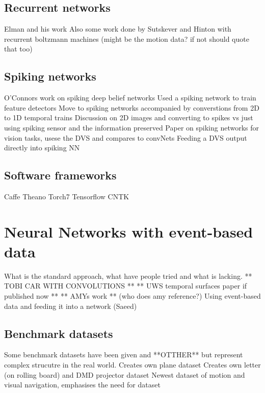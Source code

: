 \pagebreak
\subsection{Recurrent networks}  %
Elman and his work\cite{elman1990}
Also some work done by Sutskever and Hinton with recurrent boltzmann machines (might be the motion data? if not should quote that too)\cite{sutskever2009recurrent}

\pagebreak
\subsection{Spiking networks}    %
O'Connors work on spiking deep belief networks \cite{OConnor2013}
Used a spiking network to train feature detectors \cite{afshar2016investigation}
Move to spiking networks accompanied by converstions from 2D to 1D temporal trains \cite{afshar2013ripple}
Discussion on 2D images and converting to spikes vs just using spiking sensor and the information preserved \cite{akolkar2015can}
Paper on spiking networks for vision tasks, usese the DVS and compares to convNets \cite{martin2015spiking}
Feeding a DVS output directly into spiking NN \cite{Bichler}

\pagebreak
\subsection{Software frameworks}   %
Caffe\cite{jia2014caffe} Theano Torch7 Tensorflow CNTK

\section{Neural Networks with event-based data}
What is the standard approach, what have people tried and what is lacking. \cite{OConnor2013}  ** TOBI CAR WITH CONVOLUTIONS ** ** UWS temporal surfaces paper if published now ** ** AMYs work ** (who does amy reference?)
Using event-based data and feeding it into a network (Saeed) \cite{afshar2016investigation}

\subsection{Benchmark datasets}
Some benchmark datasets have been given \cite{Gibson2014} and **OTTHER** but represent complex strucutre in the real world.
Creates own plane dataset \cite{afshar2016investigation}
Creates own letter (on rolling board) and DMD projector dataset \cite{akolkar2015can}
Newest dataset of motion and visual navigation, emphasises the need for dataset \cite{barranco2016dataset}

